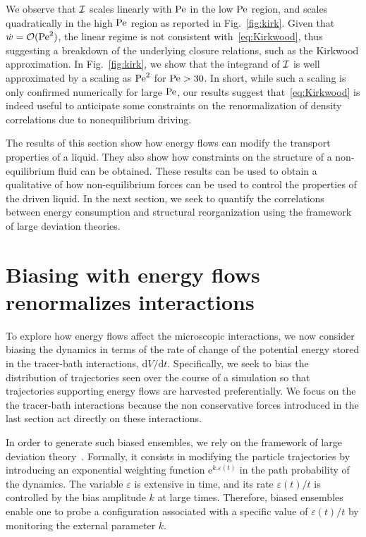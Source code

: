 \documentclass[pre, superscriptaddress, twocolumn,pre]{revtex4-1}
\newcommand{\dd}{\text{d}}
\newcommand{\ee}{\text{e}}
\begin{document}
We observe that $\cal{I}$ scales linearly with $\rm Pe$ in the low $\rm Pe$ region, and scales quadratically in the high $\rm Pe$ region as reported in Fig.~\ref{fig:kirk}. Given that $\dot w = {\cal O}({\rm Pe}^2)$, the linear regime is not consistent with~\eqref{eq:Kirkwood}, thus suggesting a breakdown of the underlying closure relations, such as the Kirkwood approximation. In Fig.~\ref{fig:kirk}, we show that the integrand of $\cal I$ is well approximated by a scaling as ${\rm Pe}^2$ for ${\rm Pe}>30$. In short, while such a scaling is only confirmed numerically for large $\rm Pe$, our results suggest that~\eqref{eq:Kirkwood} is indeed useful to anticipate some constraints on the renormalization of density correlations due to nonequilibrium driving.

The results of this section show how energy flows can modify the transport properties of a liquid. They also show how constraints on the structure of a non-equilibrium fluid can be obtained. These results can be used to obtain a qualitative of how non-equilibrium forces can be used to control the properties of the driven liquid. In the next section, we seek to quantify the correlations between energy consumption and structural reorganization using the framework of large deviation theories. 


\section{Biasing with energy flows renormalizes interactions}
\label{sec:bias}
To explore how energy flows affect the microscopic interactions, we now consider biasing the dynamics in terms of the rate of change of the potential energy stored in the tracer-bath interactions, $\dd V/\dd t$. Specifically, we seek to bias the distribution of trajectories seen over the course of a simulation so that trajectories supporting energy flows are harvested preferentially.  We focus on the the tracer-bath interactions because the non conservative forces introduced in the last section act directly on these interactions. 

In order to generate such biased ensembles, we rely on the framework of large deviation theory~\cite{Chetrite2013, Jack2010}. Formally, it consists in modifying the particle trajectories by  introducing an exponential weighting function $\ee^{ k . \varepsilon(t) }$ in the path probability of the dynamics. The variable $\varepsilon$ is extensive in time, and its rate $\varepsilon(t)/t$ is controlled by the bias amplitude $k$ at large times. Therefore, biased ensembles enable one to probe a configuration associated with a specific value of $\varepsilon(t)/t$ by monitoring the external parameter $k$.
\end{document}
